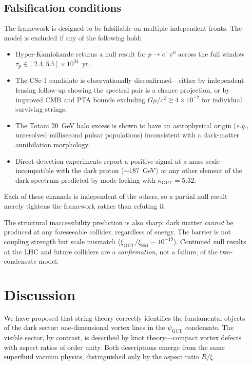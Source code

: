 \documentclass[11pt]{article}
\begin{document}
\subsection*{Falsification conditions}

The framework is designed to be falsifiable on multiple independent fronts.
The model is excluded if any of the following hold:
\begin{itemize}
\item Hyper-Kamiokande returns a null result for $p \to e^+ \pi^0$ across the full window $\tau_p \in [2.4, 5.5] \times 10^{34}$~yr.
\item The CSc-1 candidate is observationally disconfirmed---either by independent lensing follow-up showing the spectral pair is a chance projection, or by improved CMB and PTA bounds excluding $G\mu/c^2 \gtrsim 4 \times 10^{-7}$ for individual surviving strings.
\item The Totani $20$~GeV halo excess is shown to have an astrophysical origin (\emph{e.g.}, unresolved millisecond pulsar populations) inconsistent with a dark-matter annihilation morphology.
\item Direct-detection experiments report a positive signal at a mass scale incompatible with the dark proton ($\sim 187$~GeV) or any other element of the dark spectrum predicted by mode-locking with $\kappa_\text{GUT} = 5.32$.
\end{itemize}
Each of these channels is independent of the others, so a partial null result merely tightens the framework rather than refuting it.

The structural inaccessibility prediction is also sharp: dark matter \emph{cannot} be produced at any foreseeable collider, regardless of energy.
The barrier is not coupling strength but scale mismatch ($\xi_\text{GUT}/\xi_\text{SM} \sim 10^{-19}$).
Continued null results at the LHC and future colliders are a \emph{confirmation}, not a failure, of the two-condensate model.


\section{Discussion}
\label{sec:discussion}

We have proposed that string theory correctly identifies the fundamental objects of the dark sector: one-dimensional vortex lines in the $\psi_\text{GUT}$ condensate.
The visible sector, by contrast, is described by knot theory---compact vortex defects with aspect ratios of order unity.
Both descriptions emerge from the same superfluid vacuum physics, distinguished only by the aspect ratio $R/\xi$.
\end{document}
